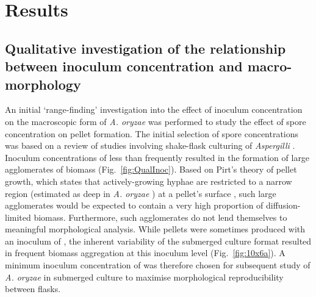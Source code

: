 \section{Results}

\subsection{Qualitative investigation of the relationship between inoculum concentration and macro-morphology}

An initial \lq range-finding' investigation into the effect of inoculum concentration on the macroscopic form of \emph{A. oryzae} was performed to study the effect of spore concentration on pellet formation. The initial selection of spore concentrations was based on a review of studies involving shake-flask culturing of \emph{Aspergilli} \cite{papagianni2002,xu2000,papagianni2006a,carlsen1996a}. Inoculum concentrations of less than  frequently resulted in the formation of large agglomerates of biomass (Fig.~\ref{fig:QualInoc}). Based on Pirt's theory of pellet growth, which states that actively-growing hyphae are restricted to a narrow region (estimated as  deep in \emph{A. oryzae} \cite{carlsen1996a}) at a pellet's surface \cite{pirt1966}, such large agglomerates would be expected to contain a very high proportion of diffusion-limited biomass. Furthermore, such agglomerates do not lend themselves to meaningful morphological analysis. While pellets were sometimes produced with an inoculum of , the inherent variability of the submerged culture format resulted in frequent biomass aggregation at this inoculum level (Fig.~\ref{fig:10x6a}). A minimum inoculum concentration of  was therefore chosen for subsequent study of \emph{A. oryzae} in submerged culture to maximise morphological reproducibility between flasks.

